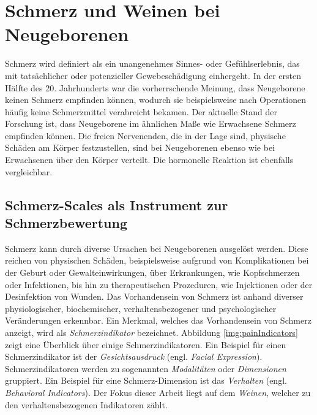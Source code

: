 \section{Schmerz und Weinen bei Neugeborenen}
\label{sec:medicalFoundations} 

Schmerz wird definiert als ein \glqq unangenehmes Sinnes- oder Gefühlserlebnis, das mit tatsächlicher oder potenzieller Gewebeschädigung einhergeht\grqq{}.\cite[S. 438]{PainAssessment01} In der ersten Hälfte des 20. Jahrhunderts war die vorherrschende Meinung, dass Neugeborene keinen Schmerz empfinden können, wodurch sie beispielsweise nach Operationen häufig keine Schmerzmittel verabreicht bekamen. Der aktuelle Stand der Forschung ist, dass Neugeborene im ähnlichen Maße wie Erwachsene Schmerz empfinden können. Die freien Nervenenden, die in der Lage sind, physische Schäden am Körper festzustellen, sind bei Neugeborenen ebenso wie bei Erwachsenen über den Körper verteilt. Die hormonelle Reaktion ist ebenfalls vergleichbar.\cite[S. 402]{PainAssessment03} \cite[S. 438]{PainAssessment01}

\subsection{Schmerz-Scales als Instrument zur Schmerzbewertung}
\label{sec:painScores}

Schmerz kann durch diverse Ursachen bei Neugeborenen ausgelöst werden. Diese reichen von physischen Schäden, beispielsweise aufgrund von Komplikationen bei der Geburt oder Gewalteinwirkungen, über Erkrankungen, wie Kopfschmerzen oder Infektionen, bis hin zu therapeutischen Prozeduren, wie Injektionen oder der Desinfektion von Wunden. Das Vorhandensein von Schmerz ist anhand diverser physiologischer, biochemischer, verhaltensbezogener und psychologischer Veränderungen erkennbar.\cite[S. 438]{PainAssessment01} Ein Merkmal, welches das Vorhandensein von Schmerz anzeigt, wird als \emph{Schmerzindikator} bezeichnet. Abbildung \ref{img:painIndicators} zeigt eine Überblick über einige Schmerzindikatoren. Ein Beispiel für einen Schmerzindikator ist der \emph{Gesichtsausdruck} (engl. \emph{Facial Expression}). Schmerzindikatoren werden zu sogenannten \emph{Modalitäten} oder \emph{Dimensionen} gruppiert. Ein Beispiel für eine Schmerz-Dimension ist das \emph{Verhalten} (engl. \emph{Behavioral Indicators}). Der Fokus dieser Arbeit liegt auf dem \emph{Weinen}, welcher zu den verhaltensbezogenen Indikatoren zählt.\cite[S. 69 - 70, 81]{PainAssessment02} \cite[S. 2]{overview}

